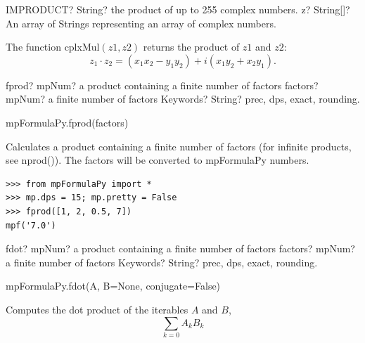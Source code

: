 \vspace{0.6cm}
\begin{mpFunctionsExtract}
	\mpWorksheetFunctionOneNotImplemented
	{IMPRODUCT? String? the product of up to 255 complex numbers.}
	{z? String[]? An array of Strings representing an array of complex numbers.}
\end{mpFunctionsExtract}


\vspace{0.3cm}
The function \textsf{cplxMul$(z1, z2)$} returns the product of $z1$ and $z2$: 
\begin{equation}
	z_1 \cdot z_2 =(x_1 x_2 - y_1 y_2) + i(x_1 y_2 + x_2 y_1).
\end{equation}





\vspace{0.3cm}
\begin{mpFunctionsExtract}
	\mpFunctionTwo
	{fprod? mpNum? a product containing a finite number of factors}
	{factors? mpNum? a finite number of factors}
	{Keywords? String? prec, dps, exact, rounding.}	
\end{mpFunctionsExtract}


mpFormulaPy.fprod(factors)

\vpara
Calculates a product containing a finite number of factors (for infinite products, see nprod()). The factors will be converted to mpFormulaPy numbers.

\begin{lstlisting}
>>> from mpFormulaPy import *
>>> mp.dps = 15; mp.pretty = False
>>> fprod([1, 2, 0.5, 7])
mpf('7.0')
\end{lstlisting}





\vspace{0.3cm}
\begin{mpFunctionsExtract}
	\mpFunctionTwo
	{fdot? mpNum? a product containing a finite number of factors}
	{factors? mpNum? a finite number of factors}
	{Keywords? String? prec, dps, exact, rounding.}	
\end{mpFunctionsExtract}

mpFormulaPy.fdot(A, B=None, conjugate=False)

\vpara
Computes the dot product of the iterables $A$ and $B$,
\begin{equation}
	\sum_{k=0} A_k B_k
\end{equation}

